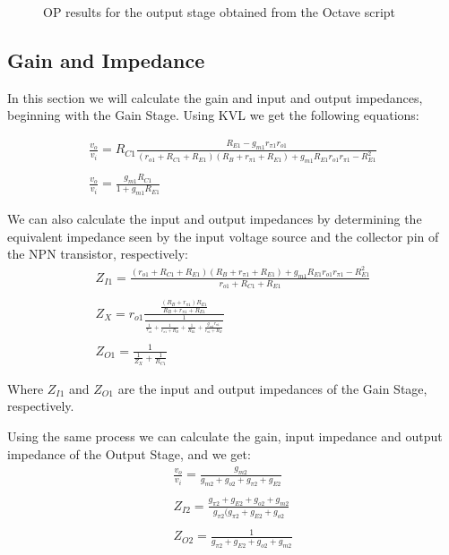 \begin{figure}[h]
	\centering
	
	\caption{OP results for the output stage obtained from the Octave script}
	\label{fig:os_results_th}
\end{figure}

\subsection{Gain and Impedance}
 
In this section we will calculate the gain and input and output impedances, beginning with the Gain Stage. Using KVL we get the following equations:
 
\vspace{15pt}
\small
\begin{gather}
	\frac{v_o}{v_i}=R_{C1}\frac{R_{E1}-g_{m1}r_{\pi 1}r_{o1}}{(r_{o1}+R_{C1}+R_{E1})(R_B+r_{\pi 1}+R_{E1})+g_{m1}R_{E1}r_{o1}r_{\pi 1}-R_{E1}^{2}} \\
	\nonumber \\
	\frac{v_o}{v_i}=\frac{g_{m1}R_{C1}}{1+g_{m1}R_{E1}}
\end{gather}
\normalsize
\vspace{15pt}
 
We can also calculate the input and output impedances by determining the equivalent impedance seen by the input voltage source and the collector pin of the NPN transistor, respectively:
\small
\begin{gather}
	Z_{I1}=\frac{(r_{o1}+R_{C1}+R_{E1})(R_B+r_{\pi 1}+R_{E1})+g_{m1}R_{E1}r_{o1}r_{\pi 1}-R_{E1}^{2}}{r_{o1}+R_{C1}+R_{E1}} \nonumber \\
    	\nonumber \\
    	Z_X=r_{o1}\frac{\frac{(R_B+r_{\pi 1})R_{E1}}{R_B+r_{\pi 1}+R_{E1}}}{\frac{1}{\frac{1}{r_{o1}}+\frac{1}{r_{\pi 1}+R_B}+\frac{1}{R_{E1}}+\frac{g_{m1}r_{\pi 1}}{r_{\pi 1}+R_B}}} \nonumber \\
   	\nonumber \\
    	Z_{O1}=\frac{1}{\frac{1}{Z_X}+\frac{1}{R_{C1}}} \nonumber
\end{gather}
\normalsize

Where $Z_{I1}$ and $Z_{O1}$ are the input and output impedances of the Gain Stage, respectively.
\vspace{15pt}

Using the same process we can calculate the gain, input impedance and output impedance of the Output Stage, and we get:
\small
\begin{gather}
    	\frac{v_o}{v_i}=\frac{g_{m2}}{g_{m2}+g_{o2}+g_{\pi 2}+g_{E2}} \nonumber \\
    	\nonumber \\
    	Z_{I2}=\frac{g_{\pi 2}+g_{E2}+g_{o2}+g_{m2}}{g_{\pi 2}(g_{\pi 2}+g_{E2}+g_{o2}} \nonumber \\
    	\nonumber \\
    	Z_{O2}=\frac{1}{g_{\pi 2}+g_{E2}+g_{o2}+g_{m2}} \nonumber
\end{gather}
\normalsize
\vspace{15pt}

